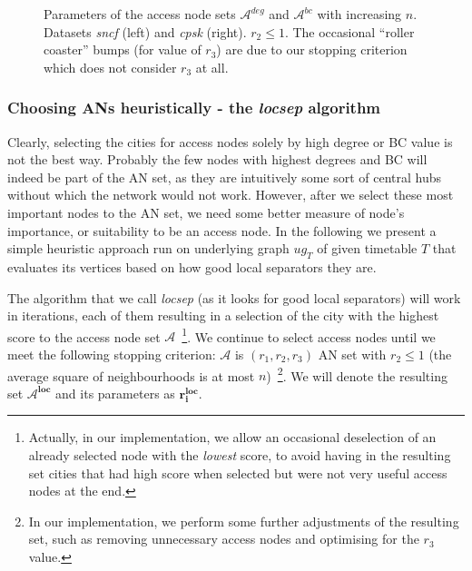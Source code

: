 		\begin{figure}[htb]
		\centering
	    \caption{\label{plot:hbcdeg-size} Parameters of the access node sets $\mathcal{A}^{deg}$ and $\mathcal{A}^{bc}$ with increasing $n$. Datasets \textit{sncf} (left) and \textit{cpsk} (right). $r_{2} \leq 1$. The occasional ``roller coaster'' bumps (for value of $r_{3}$) are due to our stopping criterion which does not consider $r_{3}$ at all.}
		\end{figure}
		
	\subsubsection{Choosing ANs heuristically - the \textit{locsep} algorithm}
	
		Clearly, selecting the cities for access nodes solely by high degree or BC value is not the best way. Probably the few nodes with highest degrees and BC will indeed be part of the AN set, as they are intuitively some sort of central hubs without which the network would not work. However, after we select these most important nodes to the AN set, we need some better measure of node's importance, or suitability to be an access node. In the following we present a simple heuristic approach run on underlying graph $ug_{T}$ of given timetable $T$ that evaluates its vertices based on how good local separators they are. 
		
		The algorithm that we call \textit{locsep} (as it looks for good local separators) will work in iterations, each of them resulting in a selection of the city with the highest score to the access node set $\mathcal{A}$~\footnote{Actually, in our implementation, we allow an occasional deselection of an already selected node with the \textit{lowest} score, to avoid having in the resulting set cities that had high score when selected but were not very useful access nodes at the end.}. We continue to select access nodes until we meet the following stopping criterion: $\mathcal{A}$ is $(r_{1}, r_{2}, r_{3})$ AN set with $r_{2} \leq 1$ (the average square of neighbourhoods is at most $n$)~\footnote{In our implementation, we perform some further adjustments of the resulting set, such as removing unnecessary access nodes and optimising for the $r_{3}$ value.}. We will denote the resulting set $\bm{\mathcal{A}^{loc}}$ and its parameters as $\bm{r_{i}^{loc}}$.
		
